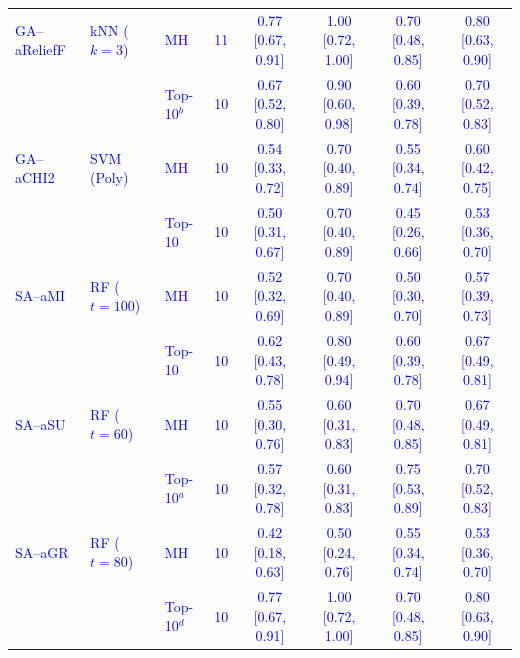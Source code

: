 \begin{table}[!ht]
{\begin{tabular}{llllcccc}
\textcolor{blue}{GA--aReliefF} & \textcolor{blue}{kNN ($k=3$)} & \textcolor{blue}{MH} & \textcolor{blue}{11} & \textcolor{blue}{0.77 [0.67, 0.91]} & \textcolor{blue}{1.00 [0.72, 1.00]} & \textcolor{blue}{0.70 [0.48, 0.85]} & \textcolor{blue}{0.80 [0.63, 0.90]} \\
 &  & \textcolor{blue}{Top-10$^{b}$} & \textcolor{blue}{10} & \textcolor{blue}{0.67 [0.52, 0.80]} & \textcolor{blue}{0.90 [0.60, 0.98]} & \textcolor{blue}{0.60 [0.39, 0.78]} & \textcolor{blue}{0.70 [0.52, 0.83]} \\
\textcolor{blue}{GA--aCHI2} & \textcolor{blue}{SVM (Poly)} & \textcolor{blue}{MH} & \textcolor{blue}{10} & \textcolor{blue}{0.54 [0.33, 0.72]} & \textcolor{blue}{0.70 [0.40, 0.89]} & \textcolor{blue}{0.55 [0.34, 0.74]} & \textcolor{blue}{0.60 [0.42, 0.75]} \\
 &  & \textcolor{blue}{Top-10} & \textcolor{blue}{10} & \textcolor{blue}{0.50 [0.31, 0.67]} & \textcolor{blue}{0.70 [0.40, 0.89]} & \textcolor{blue}{0.45 [0.26, 0.66]} & \textcolor{blue}{0.53 [0.36, 0.70]} \\
\hline
\textcolor{blue}{SA--aMI} & \textcolor{blue}{RF ($t=100$)} & \textcolor{blue}{MH} & \textcolor{blue}{10} & \textcolor{blue}{0.52 [0.32, 0.69]} & \textcolor{blue}{0.70 [0.40, 0.89]} & \textcolor{blue}{0.50 [0.30, 0.70]} & \textcolor{blue}{0.57 [0.39, 0.73]} \\
 &  & \textcolor{blue}{Top-10} & \textcolor{blue}{10} & \textcolor{blue}{0.62 [0.43, 0.78]} & \textcolor{blue}{0.80 [0.49, 0.94]} & \textcolor{blue}{0.60 [0.39, 0.78]} & \textcolor{blue}{0.67 [0.49, 0.81]} \\
\textcolor{blue}{SA--aSU} & \textcolor{blue}{RF ($t=60$)} & \textcolor{blue}{MH} & \textcolor{blue}{10} & \textcolor{blue}{0.55 [0.30, 0.76]} & \textcolor{blue}{0.60 [0.31, 0.83]} & \textcolor{blue}{0.70 [0.48, 0.85]} & \textcolor{blue}{0.67 [0.49, 0.81]} \\
 &  & \textcolor{blue}{Top-10$^{a}$} & \textcolor{blue}{10} & \textcolor{blue}{0.57 [0.32, 0.78]} & \textcolor{blue}{0.60 [0.31, 0.83]} & \textcolor{blue}{0.75 [0.53, 0.89]} & \textcolor{blue}{0.70 [0.52, 0.83]} \\
\textcolor{blue}{SA--aGR} & \textcolor{blue}{RF ($t=80$)} & \textcolor{blue}{MH} & \textcolor{blue}{10} & \textcolor{blue}{0.42 [0.18, 0.63]} & \textcolor{blue}{0.50 [0.24, 0.76]} & \textcolor{blue}{0.55 [0.34, 0.74]} & \textcolor{blue}{0.53 [0.36, 0.70]} \\
 &  & \textcolor{blue}{Top-10$^{d}$} & \textcolor{blue}{10} & \textcolor{blue}{0.77 [0.67, 0.91]} & \textcolor{blue}{1.00 [0.72, 1.00]} & \textcolor{blue}{0.70 [0.48, 0.85]} & \textcolor{blue}{0.80 [0.63, 0.90]} \\

\end{tabular}}
\end{table}
